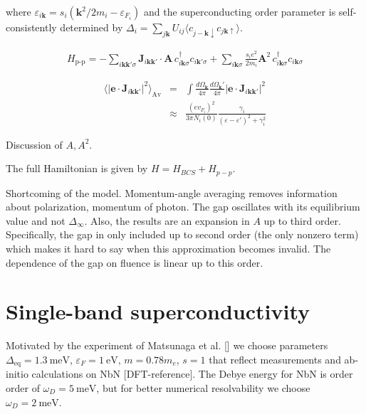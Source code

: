\documentclass[aps,prb,reprint,noeprint,superscriptaddress]{revtex4-1}
\begin{document}
where $\varepsilon_{i\mathbf{k}} = s_i \left(\mathbf{k}^2/2m_i -
\varepsilon_{F_i}\right)$ and the superconducting order parameter is self-consistently determined by 
$\Delta_i = \sum_{j\mathbf{k}}^{}U_{ij} \langle c_{j-\mathbf{k}\downarrow
}c_{j\mathbf{k}\uparrow }\rangle$.

\begin{eqnarray*}
	H_{\text{p-p}} = -\sum_{i\mathbf{kk'}\sigma}^{}
	\mathbf{J}_{i\mathbf{kk'}} \cdot \mathbf{A} \,
	c_{i\mathbf{k}\sigma}^\dagger  c_{i\mathbf{k}'\sigma} +
	\sum_{i\mathbf{k}\sigma}^{} \frac{s_i e^2}{2m_i} \mathbf{A}^2 \,
	c_{i\mathbf{k}\sigma}^\dagger c_{i\mathbf{k}\sigma}
\end{eqnarray*}

\begin{eqnarray*}
	\langle \left|\mathbf{e} \cdot
	\mathbf{J}_{i\mathbf{kk'}}\right|^2\rangle_{\text{Av}}
	&=& \int \frac{d\Omega_\mathbf{k}}{4\pi} \frac{d\Omega_\mathbf{k}'}{4\pi}
	\left|\mathbf{e} \cdot \mathbf{J}_{i\mathbf{kk'}}\right|^2
	\\
	&\approx& \frac{(e v_{F_i})^2}{3 \pi N_i(0)} 
	\frac{\gamma_i}{(\varepsilon-\varepsilon')^2 + \gamma_i^2}
\end{eqnarray*}

Discussion of $A, A^2$.

The full Hamiltonian is given by $H = H_{BCS} + H_{p-p}$.







Shortcoming of the model. Momentum-angle averaging removes information about
polarization, momentum of photon. The gap oscillates with its equilibrium value
and not $\Delta_{\infty}$. Also, the results are an expansion in $A$ up to third
order. Specifically, the gap in only included up to second order (the only
nonzero term) which makes it hard to say when this approximation becomes
invalid. The dependence of the gap on fluence is linear up to this order.


\section{Single-band superconductivity}
\label{sec:singleband}

Motivated by the experiment of Matsunaga et al. [] we choose parameters
$\Delta_{\text{eq}}=\SI{1.3}{\milli\electronvolt}$,
$\varepsilon_{F}=\SI{1}{\electronvolt}$, $m=0.78 m_e$, $s=1$ that reflect
measurements and ab-initio calculations on NbN [DFT-reference].
The Debye energy for NbN is order order of $\omega_D = \SI{5}{\milli\electronvolt}$, but
for better numerical resolvability we choose $\omega_D =
\SI{2}{\milli\electronvolt}$.
\end{document}
